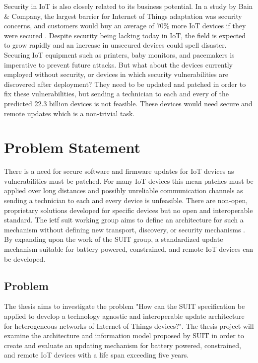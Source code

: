 \documentclass[0-thesis.tex]{subfiles}
\begin{document}
Security in IoT is also closely related to its business potential. In a study by Bain \&
Company, the largest barrier for Internet of Things adaptation was security concerns, and
customers would buy an average of 70\% more IoT devices if they were secured
\parencite{ali_bosche_ford_2018}. Despite security being lacking today in IoT, the field
is expected to grow rapidly and an increase in unsecured devices could spell disaster.
Securing IoT equipment such as printers, baby monitors, and pacemakers is imperative to
prevent future attacks. But what about the devices currently employed without security, or
devices in which security vulnerabilities are discovered after deployment? They need to be
updated and patched in order to fix these vulnerabilities, but sending a technician to
each and every of the predicted 22.3 billion devices is not feasible. These devices would
need secure and remote updates which is a non-trivial task.

\section{Problem Statement}
\label{sec:problem-statement}
There is a need for secure software and firmware updates for IoT devices as
vulnerabilities must be patched. For many IoT devices this mean patches must be applied
over long distances and possibly unreliable communication channels as sending a technician
to each and every device is unfeasible. There are non-open, proprietary solutions
developed for specific devices but no open and interoperable standard. The \gls{ietf}
\gls{suit} working group aims to define an architecture for such a mechanism without
defining new transport, discovery, or security mechanisms \parencite{suit}. By expanding
upon the work of the SUIT group, a standardized update mechanism suitable for battery
powered, constrained, and remote IoT devices can be developed.

\subsection{Problem}
\label{ssec:problem}
The thesis aims to investigate the problem "How can the SUIT specification be applied to
develop a technology agnostic and interoperable update architecture for heterogeneous
networks of Internet of Things devices?". The thesis project will examine the architecture
and information model proposed by SUIT in order to create and evaluate an updating
mechanism for battery powered, constrained, and remote IoT devices with a life span
exceeding five years.
\end{document}

